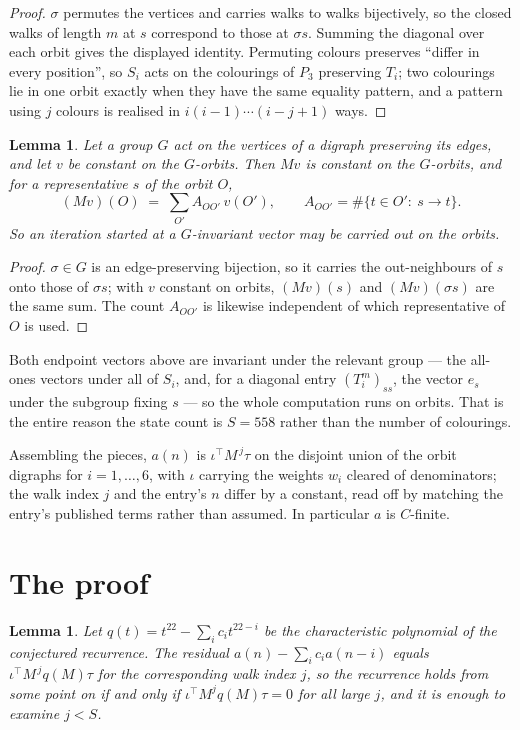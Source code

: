 \documentclass[11pt,a4paper]{article}
\theoremstyle{plain}
\newtheorem{lemma}[theorem]{Lemma}
\theoremstyle{definition}
\begin{document}
\begin{proof}
$\sigma$ permutes the vertices and carries walks to walks bijectively, so the closed walks of
length $m$ at $s$ correspond to those at $\sigma s$. Summing the diagonal over each orbit
gives the displayed identity. Permuting colours preserves ``differ in every position'', so
$S_i$ acts on the colourings of $P_{3}$ preserving $T_i$; two colourings lie in one orbit
exactly when they have the same equality pattern, and a pattern using $j$ colours is realised
in $i(i-1)\cdots(i-j+1)$ ways.
\end{proof}

\begin{lemma}\label{lem:lump}
Let a group $G$ act on the vertices of a digraph preserving its edges, and let $v$ be constant
on the $G$-orbits. Then $Mv$ is constant on the $G$-orbits, and for a representative $s$ of
the orbit $O$,
\[
(Mv)(O)\;=\;\sum_{O'}A_{OO'}\,v(O'),\qquad
A_{OO'}=\#\{t\in O':\ s\to t\} .
\]
So an iteration started at a $G$-invariant vector may be carried out on the orbits.
\end{lemma}

\begin{proof}
$\sigma\in G$ is an edge-preserving bijection, so it carries the out-neighbours of $s$ onto
those of $\sigma s$; with $v$ constant on orbits, $(Mv)(s)$ and $(Mv)(\sigma s)$ are the same
sum. The count $A_{OO'}$ is likewise independent of which representative of $O$ is used.
\end{proof}

Both endpoint vectors above are invariant under the relevant group --- the all-ones vectors
under all of $S_i$, and, for a diagonal entry $(T_i^m)_{ss}$, the vector $e_s$ under the
subgroup fixing $s$ --- so the whole computation runs on orbits. That is the entire reason the
state count is $S=558$ rather than the number of colourings.

Assembling the pieces, $a(n)$ is $\iota^{\!\top}M^{\,j}\tau$ on the disjoint union of the
orbit digraphs for $i=1,\dots,6$, with $\iota$ carrying the weights $w_i$ cleared of
denominators; the walk index $j$ and the entry's $n$ differ by a constant, read off by
matching the entry's published terms rather than assumed. In particular $a$ is $C$-finite.

\section{The proof}

\begin{lemma}\label{lem:crit}
Let $q(t)=t^{22}-\sum_i c_it^{22-i}$ be the characteristic polynomial of the
conjectured recurrence. The residual $a(n)-\sum_ic_ia(n-i)$ equals
$\iota^{\!\top}M^{\,j}q(M)\tau$ for the corresponding walk index $j$, so the recurrence
holds from some point on if and only if $\iota^{\!\top}M^{j}q(M)\tau=0$ for all large $j$,
and it is enough to examine $j<S$.
\end{lemma}
\end{document}
